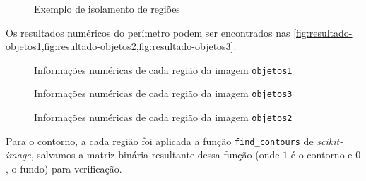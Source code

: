\documentclass[brazilian,a4paper,twocolumn]{article}
\begin{document}
\begin{figure}[H]
            \caption{Exemplo de isolamento de regiões}
            \label{fig:isolamento-regioes}
        \end{figure}

        Os resultados numéricos do perímetro podem ser encontrados nas \cref{fig:resultado-objetos1,fig:resultado-objetos2,fig:resultado-objetos3}.

        \begin{figure}
            \begin{mdframed}
                \begin{scriptsize}
                    
                \end{scriptsize}
            \end{mdframed}

            \caption{Informações numéricas de cada região da imagem \texttt{objetos1}}
            \label{fig:resultado-objetos1}
        \end{figure}

        \begin{figure}
            \begin{mdframed}
                \begin{scriptsize}
                    
                \end{scriptsize}
            \end{mdframed}

            \caption{Informações numéricas de cada região da imagem \texttt{objetos3}}
            \label{fig:resultado-objetos3}
        \end{figure}

        \begin{figure}
            \begin{mdframed}
                \begin{scriptsize}
                    
                \end{scriptsize}
            \end{mdframed}

            \caption{Informações numéricas de cada região da imagem \texttt{objetos2}}
            \label{fig:resultado-objetos2}
        \end{figure}

        Para o contorno, a cada região foi aplicada a função \texttt{find_contours} de \emph{scikit-image}, salvamos a matriz binária resultante dessa função (onde $1$ é o contorno e $0$, o fundo) para verificação.
\end{document}
